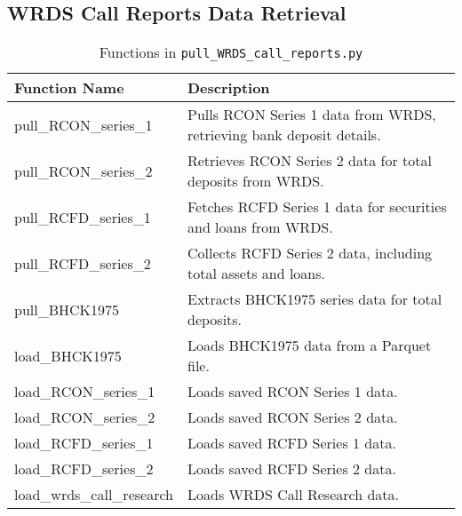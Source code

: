 \documentclass{article}
\begin{document}
\subsection{WRDS Call Reports Data Retrieval}
\begin{table}[H]
    \centering
    \caption{Functions in \texttt{pull\_WRDS\_call\_reports.py}}
    \begin{tabular}{|l|p{10cm}|}
        \hline
        \textbf{Function Name} & \textbf{Description} \\
        \hline
        pull\_RCON\_series\_1 & Pulls RCON Series 1 data from WRDS, retrieving bank deposit details. \\
        \hline
        pull\_RCON\_series\_2 & Retrieves RCON Series 2 data for total deposits from WRDS. \\
        \hline
        pull\_RCFD\_series\_1 & Fetches RCFD Series 1 data for securities and loans from WRDS. \\
        \hline
        pull\_RCFD\_series\_2 & Collects RCFD Series 2 data, including total assets and loans. \\
        \hline
        pull\_BHCK1975 & Extracts BHCK1975 series data for total deposits. \\
        \hline
        load\_BHCK1975 & Loads BHCK1975 data from a Parquet file. \\
        \hline
        load\_RCON\_series\_1 & Loads saved RCON Series 1 data. \\
        \hline
        load\_RCON\_series\_2 & Loads saved RCON Series 2 data. \\
        \hline
        load\_RCFD\_series\_1 & Loads saved RCFD Series 1 data. \\
        \hline
        load\_RCFD\_series\_2 & Loads saved RCFD Series 2 data. \\
        \hline
        load\_wrds\_call\_research & Loads WRDS Call Research data. \\
        \hline
    \end{tabular}
\end{table}
\end{document}
